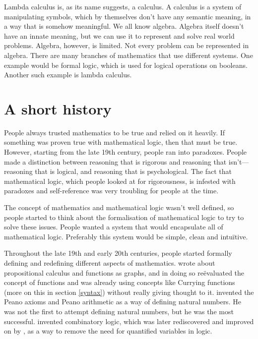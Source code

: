 \documentclass[11pt]{book}
\begin{document}
Lambda calculus is, as its name suggests, a calculus. A calculus is a system of
manipulating symbols, which by themselves don't have any semantic meaning, in a
way that is somehow meaningful. We all know algebra. Algebra itself doesn't
have an innate meaning, but we can use it to represent and solve real world
problems. Algebra, however, is limited. Not every problem can be represented in
algebra. There are many branches of mathematics that use different systems.
One example would be formal logic, which is used for logical operations on
booleans. Another such example is lambda calculus.

\section{A short history\label{history}}

People always trusted mathematics to be true and relied on it heavily. If
something was proven true with mathematical logic, then that must be true.
However, starting from the late 19th century, people ran into paradoxes. People
made a distinction between reasoning that is rigorous and reasoning that
isn't---reasoning that is logical, and reasoning that is psychological. The
fact that mathematical logic, which people looked at for rigorousness, is
infested with paradoxes and self-reference was very troubling for people at the
time.

The concept of mathematics and mathematical logic wasn't well defined, so
people started to think about the formalisation of mathematical logic to try to
solve these issues. People wanted a system that would encapsulate all of
mathematical logic. Preferably this system would be simple, clean and
intuïtive.

Throughout the late 19th and early 20th centuries, people started formally
defining and redefining different aspects of mathematics. \textcite{frege1879}
wrote about propositional calculus and functions as graphs, and in doing so
reëvaluated the concept of functions and was already using concepts like
Currying functions (more on this in section \ref{syntax}) without really giving
thought to it. \textcite{peano1889} invented the Peano axioms and Peano
arithmetic as a way of defining natural numbers. He was not the first to
attempt defining natural numbers, but he was the most successful.
\textcite{schonfinkel1924} invented combinatory logic, which was later
rediscovered and improved on by \textcite{curry1930}, as a way to remove the
need for quantified variables in logic.
\end{document}
